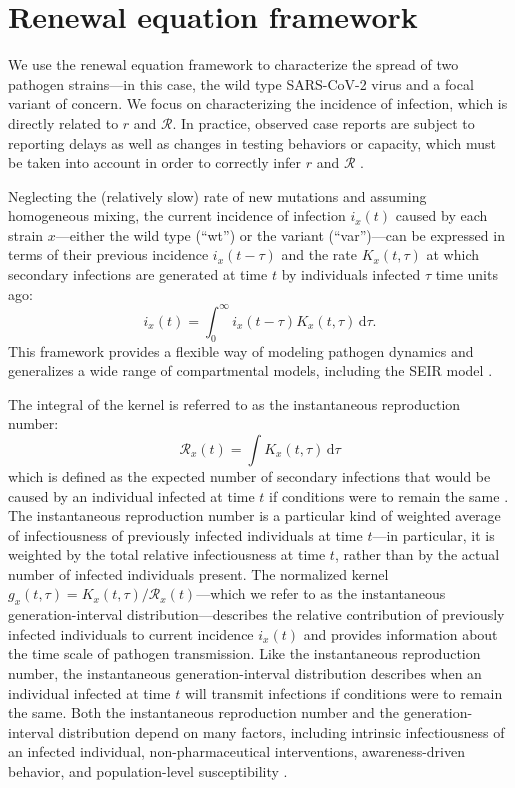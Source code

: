 \documentclass[12pt]{article}
\newcommand{\RR}{\ensuremath{{\mathcal R}}\xspace}
\newcommand{\dd}[1]{\ensuremath{\, \mathrm{d}#1}}
\newcommand{\dtau}{\dd{\tau}}
\begin{document}
\section{Renewal equation framework}

We use the renewal equation framework to characterize the spread of two pathogen strains---in this case, the wild type SARS-CoV-2 virus and a focal variant of concern.
We focus on characterizing the incidence of infection, which is directly related to $r$ and $\RR$.
In practice, observed case reports are subject to reporting delays as well as changes in testing behaviors or capacity, which must be taken into account in order to correctly infer $r$ and $\RR$ \citep{goldstein2009reconstructing,gostic2020practical}.

Neglecting the (relatively slow) rate of new mutations and assuming homogeneous mixing, the current incidence of infection $i_x(t)$ caused by each strain $x$---either the wild type (``wt'') or the variant (``var'')---can be expressed in terms of their previous incidence $i_x(t-\tau)$ and the rate $K_x(t, \tau)$ at which secondary infections are generated at time $t$ by individuals infected $\tau$ time units ago:
\begin{equation}
i_x(t) = \int_0^\infty i_x(t-\tau) K_x(t, \tau) \dtau.
\end{equation}
This framework provides a flexible way of modeling pathogen dynamics and generalizes a wide range of compartmental models, including the SEIR model \citep{heesterbeek1996concept, diekmann2000mathematical, roberts2004modelling, aldis2005integral,breda2012formulation, champredon2018equivalence}.

The integral of the kernel is referred to as the instantaneous reproduction number:
\begin{equation}
\RR_x(t) = \int K_x(t, \tau) \dtau
\label{eq:instR}
\end{equation}
which is defined as the expected number of secondary infections that would be caused by an individual infected at time $t$ if conditions were to remain the same \citep{fraser2007estimating}.
The instantaneous reproduction number is a particular kind of weighted average of infectiousness of previously infected individuals at time $t$---in particular, it is weighted by the total relative infectiousness at time $t$, rather than by the actual number of infected individuals present.
The normalized kernel $g_x(t, \tau) = K_x(t, \tau)/\RR_x(t)$---which we refer to as the instantaneous generation-interval distribution---describes the relative contribution of previously infected individuals to current incidence $i_x(t)$ and provides information about the time scale of pathogen transmission.
Like the instantaneous reproduction number, the instantaneous generation-interval distribution describes when an individual infected at time $t$ will transmit infections if conditions were to remain the same.
Both the instantaneous reproduction number and the generation-interval distribution depend on many factors, including intrinsic infectiousness of an infected individual, non-pharmaceutical interventions, awareness-driven behavior, and population-level susceptibility \citep{fraser2007estimating}.
\end{document}
